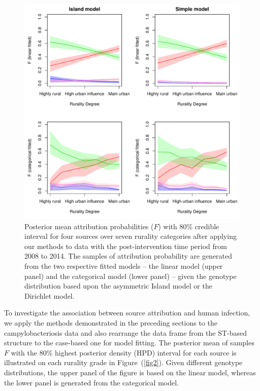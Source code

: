 \documentclass[times, doublespace]{simauth}%
\begin{document}
\begin{figure}
\centering
\includegraphics[width=.9\linewidth]{Figures/FCILandC(8)}
\caption{Posterior mean attribution probabilities ($F$) with 80\% credible interval for four sources over seven rurality categories after applying our methods to data with the post-intervention time period from 2008 to 2014. The samples of attribution probability are generated from the two respective fitted models -- the linear model (upper panel) and the categorical model (lower panel) -- given the genotype distribution based upon the asymmetric Island model or the Dirichlet model.}
\label{fig3}
\end{figure}

To investigate the association between source attribution and human infection, we apply the methods demonstrated in the preceding sections to the campylobacteriosis data and also rearrange the data frame from the ST-based structure to the case-based one for model fitting. The posterior mean of samples $F$ with the 80\% highest posterior density (HPD) interval for each source is illustrated on each rurality grade in Figure~(\ref{fig2}). Given different genotype distributions, the upper panel of the figure is based on the linear model, whereas the lower panel is generated from the categorical model.
\end{document}
